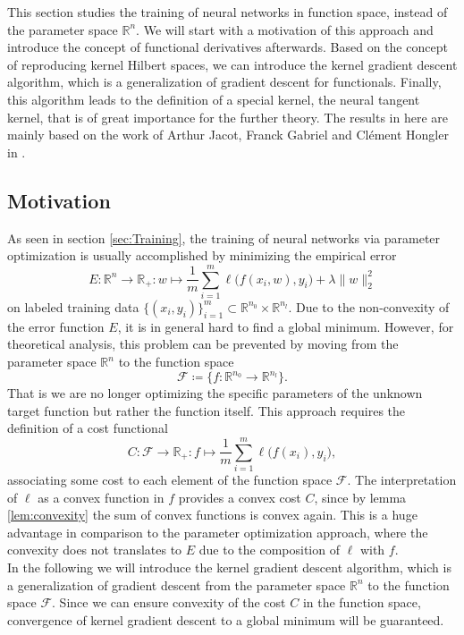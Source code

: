 \documentclass[11pt, a4paper]{article}
\newcommand{\R}{\mathbb{R}}
\newcommand{\F}{\mathcal{F}}
\begin{document}
This section studies the training of neural networks in function space, instead of the parameter space $\R^n$. We will start with a motivation of this approach and introduce the concept of functional derivatives afterwards. Based on the concept of reproducing kernel Hilbert spaces, we can introduce the kernel gradient descent algorithm, which is a generalization of gradient descent for functionals. Finally, this algorithm leads to the definition of a special kernel, the neural tangent kernel, that is of great importance for the further theory. The results in here are mainly based on the work of Arthur Jacot, Franck Gabriel and Cl\'{e}ment Hongler in \cite{NTK}.

\subsection{Motivation}

As seen in section \ref{sec:Training}, the training of neural networks via parameter optimization is usually accomplished by minimizing the empirical error
\[ E : \R^n \to \R_+ : w \mapsto \frac{1}{m} \sum_{i=1}^{m} \ell \big ( f(x_i,w),y_i \big) + \lambda \big \| w \big \|_2^2 \]
on labeled training data $\{ (x_i,y_i) \}_{i=1}^m \subset \R^{n_0} \times \R^{n_l}$. Due to the non-convexity of the error function $E$, it is in general hard to find a global minimum. However, for theoretical analysis, this problem can be prevented by moving from the parameter space $\R^n$ to the function space
\[ \F \coloneq \Big \{ f: \R^{n_0} \to \R^{n_l} \Big \}. \]
That is we are no longer optimizing the specific parameters of the unknown target function but rather the function itself. This approach requires the definition of a cost functional
\[ C: \F \to \R_+ : f \mapsto \frac{1}{m} \sum_{i=1}^{m} \ell \big ( f(x_i),y_i \big), \]
associating some cost to each element of the function space $\F$. The interpretation of $\ell$ as a convex function in $f$ provides a convex cost $C$, since by lemma \ref{lem:convexity} the sum of convex functions is convex again. This is a huge advantage in comparison to the parameter optimization approach, where the convexity does not translates to $E$ due to the composition of $\ell$ with $f$. \\

In the following we will introduce the kernel gradient descent algorithm, which is a generalization of gradient descent from the parameter space $\R^n$ to the function space $\F$. Since we can ensure convexity of the cost $C$ in the function space, convergence of kernel gradient descent to a global minimum will be guaranteed. \\
\end{document}
